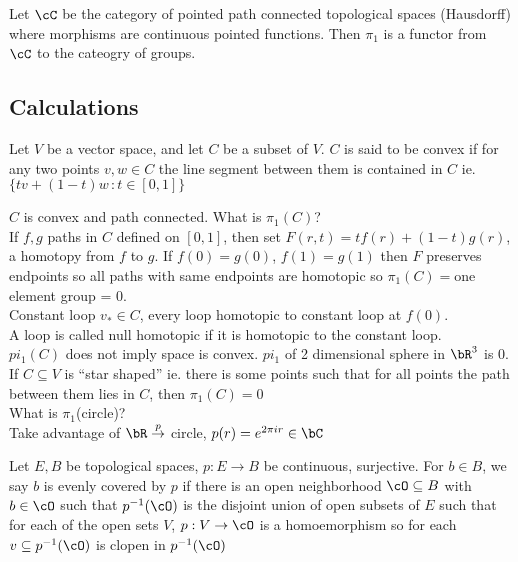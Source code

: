 

Let $\cC$ be the category of pointed path connected topological spaces (Hausdorff) where morphisms are continuous pointed functions. Then $\pi_1$ is a functor from $\cC$ to the cateogry of groups. 

\subsection{Calculations}

\begin{definition}
    Let $V$ be a vector space, and let $C$ be a subset of $V$. $C$ is said to be convex if for any two points $v, w \in C$ the line segment between them is contained in $C$ ie. $\{tv + (1-t)w \, : t \in [0,1]\}$ 
\end{definition}

\noindent
$C$ is convex and path connected. What is $\pi_1 (C)$? \\
If $f,g$ paths in $C$ defined on $[0,1]$, then set $F(r,t) = tf(r) + (1-t)g(r)$, a homotopy from $f$ to $g$. If $f(0)=g(0)$, $f(1) = g(1)$ then $F$ preserves endpoints so all paths with same endpoints are homotopic so $\pi_1(C) = $one element group = 0. \\
Constant loop $v_* \in C$, every loop homotopic to constant loop at $f(0)$. \\
A loop is called null homotopic if it is homotopic to the constant loop. \\
$pi_1(C)$ does not imply space is convex. $pi_1$ of 2 dimensional sphere in $\bR^3$ is 0. \\
If $C \subseteq V$ is ``star shaped'' ie. there is some points such that for all points the path between them lies in $C$, then $\pi_1(C)=0$ \\ 

\noindent
What is $\pi_1$(circle)? \\
Take advantage of $\bR \stackrel{p}{\to}$ circle, $p(r) = e^{2 \pi i r} \in \bC$ 

\begin{definition}
    Let $E,B$ be topological spaces, $p: E \to B$ be continuous, surjective. For $b \in B$, we say $b$ is evenly covered by $p$ if there is an open neighborhood $\cO \subseteq B$ with $b \in \cO$ such that $p^{-1}(\cO)$ is the disjoint union of open subsets of $E$ such that for each of the open sets $V$, $p: V \to \cO$ is a homoemorphism so for each $v \subseteq p^{-1}(\cO)$ is clopen in $p^{-1}(\cO)$ 
\end{definition}

